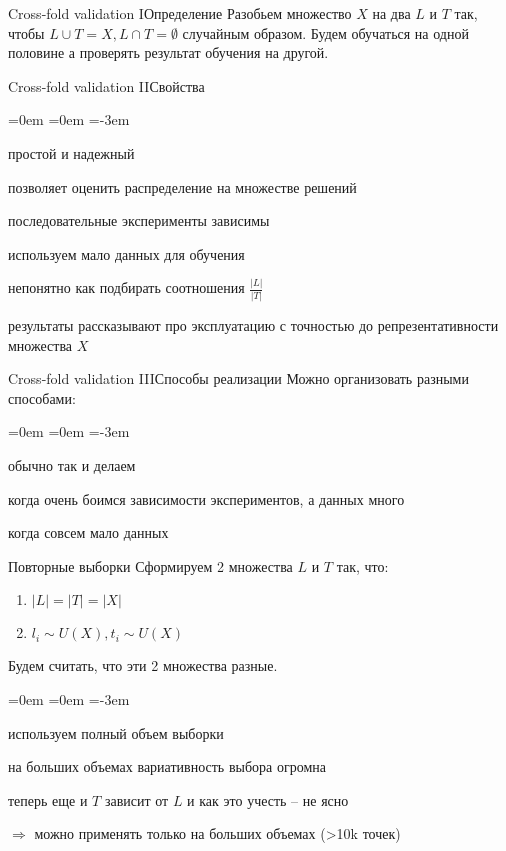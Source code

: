 \documentclass[14pt, fleqn, xcolor={dvipsnames, table}]{beamer}
\begin{document}
\begin{frame}{Cross-fold validation I}{Определение}
Разобьем множество $X$ на два $L$ и $T$ так, чтобы $L \cup T = X, L \cap T = \emptyset$ случайным образом.
Будем обучаться на одной половине а проверять результат обучения на другой.
\end{frame}

\begin{frame}{Cross-fold validation II}{Свойства}
\begin{description}
\itemindent=0em
=0em
\leftskip=-3em
  \item[\color{green}+] простой и надежный
  \item[\color{green}+] позволяет оценить распределение на множестве решений
  \item[\color{red}--] последовательные эксперименты зависимы
  \item[\color{red}--] используем мало данных для обучения
  \item[\color{red}--] непонятно как подбирать соотношения $\frac{|L|}{|T|}$
  \item[\color{red}--] результаты рассказывают про эксплуатацию с точностью до репрезентативности множества $X$
\end{description}
\end{frame}

\begin{frame}{Cross-fold validation III}{Способы реализации}
Можно организовать разными способами:
\begin{description}
\itemindent=0em
=0em
\leftskip=-3em
  \item[2-fold] обычно так и делаем
  \item[k-fold] когда очень боимся зависимости экспериментов, а данных много
  \item[Leave-one-out (LOO)] когда совсем мало данных
\end{description}
\end{frame}

\begin{frame}{Повторные выборки}
Сформируем 2 множества $L$ и $T$ так, что:
\begin{enumerate}
  \item $|L| = |T| = |X|$
  \item $l_i \sim U(X), t_i \sim U(X)$
\end{enumerate}
Будем считать, что эти 2 множества разные.
\begin{description}
\itemindent=0em
=0em
\leftskip=-3em
  \item[\color{green}+] используем полный объем выборки
  \item[\color{green}+] на больших объемах вариативность выбора огромна
  \item[\color{red}--] теперь еще и $T$ зависит от $L$ и как это учесть -- не ясно
\end{description}
$\Rightarrow$ можно применять только на больших объемах (>10k точек)
\end{frame}
\end{document}
